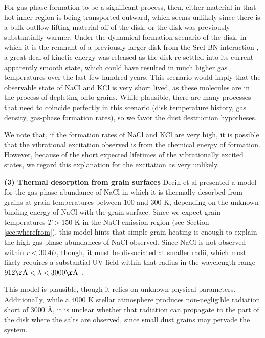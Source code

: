 \documentclass[12pt]{article}
\newcommand{\sourcei}{SrcI\xspace}
\begin{document}
For gas-phase formation to be a significant process, then, either material in
that hot inner region is being transported outward, which seems unlikely since
there is a bulk outflow lifting material off of the disk, or the disk was
previously substantially warmer.  Under the dynamical formation scenario of the
disk, in which it is the remnant of a previously larger disk from the
\sourcei-BN interaction \cite{Bally2017a,Luhman2017a}, a great deal of kinetic
energy was released as the disk re-settled into its current apparently smooth
state, which could have resulted in much higher gas temperatures over the last
few hundred years.  This scenario would imply that the observable state of NaCl
and KCl is very short lived, as these molecules are in the process of depleting
onto grains.  While plausible, there are many processes that need to coincide
perfectly in this scenario (disk temperature history, gas density, gas-phase
formation rates), so we favor the dust destruction hypotheses.

We note that, if the formation rates of NaCl and KCl are very high, it is
possible that the vibrational excitation observed is from the chemical energy
of formation.  However, because of the short expected lifetimes of the
vibrationally excited states, we regard this explanation for the excitation as
very unlikely.

\textbf{(3) Thermal desorption from grain surfaces}
Decin et al \cite{Decin2016a} presented a model for the gas-phase abundance of
NaCl in which it is thermally desorbed from grains at grain temperatures
between 100 and 300 K, depending on the unknown binding energy of NaCl with
the grain surface.  Since we expect grain temperatures $T>150$ K in the
NaCl emission region (see Section \ref{sec:wherefrom}), this model hints
that simple grain heating is enough to explain the high gas-phase abundances
of NaCl observed.  Since NaCl is not observed within $r<30 AU$, though,
it must be dissociated at smaller radii, which most likely requires
a substantial UV field within that radius in the wavelength range
$912 \mathrm{\AA} < \lambda < 3000 \mathrm{\AA}$ \cite{Silver1986a}.

This model is plausible, though it relies on unknown physical parameters.
Additionally, while a 4000 K stellar atmosphere \cite{Testi2010a} produces
non-negligible radiation short of 3000 \AA, it is unclear whether that
radiation can propagate to the part of the disk where the salts are observed,
since small dust grains may pervade the system.
\end{document}
